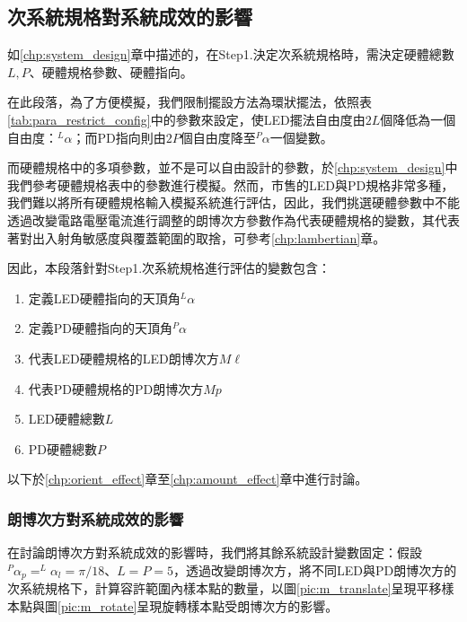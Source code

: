 \subsection{次系統規格對系統成效的影響}
\label{chp:design_result}

如\ref{chp:system_design}章中描述的，在Step1.決定次系統規格時，需決定硬體總數$L,P$、硬體規格參數、硬體指向。

在此段落，為了方便模擬，我們限制擺設方法為環狀擺法，依照表\ref{tab:para_restrict_config}中的參數來設定，使LED擺法自由度由$2L$個降低為一個自由度：$^L\alpha$；而PD指向則由$2P$個自由度降至$^P\alpha$一個變數。

而硬體規格中的多項參數，並不是可以自由設計的參數，於\ref{chp:system_design}中我們參考硬體規格表中的參數進行模擬。然而，市售的LED與PD規格非常多種，我們難以將所有硬體規格輸入模擬系統進行評估，因此，我們挑選硬體參數中不能透過改變電路電壓電流進行調整的朗博次方參數作為代表硬體規格的變數，其代表著對出入射角敏感度與覆蓋範圍的取捨，可參考\ref{chp:lambertian}章。

因此，本段落針對Step1.次系統規格進行評估的變數包含：
\begin{enumerate}
    \item 定義LED硬體指向的天頂角$^L\alpha$
    \item 定義PD硬體指向的天頂角$^P\alpha$
    \item 代表LED硬體規格的LED朗博次方$M\ell$
    \item 代表PD硬體規格的PD朗博次方$Mp$
    \item LED硬體總數$L$
    \item PD硬體總數$P$

\end{enumerate}

以下於\ref{chp:orient_effect}章至\ref{chp:amount_effect}章中進行討論。











\subsubsection{朗博次方對系統成效的影響}
\label{chp:m_effect}

在討論朗博次方對系統成效的影響時，我們將其餘系統設計變數固定：假設$^P\alpha_p =^L\alpha_l = \pi/18$、$L=P=5$，透過改變朗博次方，將不同LED與PD朗博次方的次系統規格下，計算容許範圍內樣本點的數量，以圖\ref{pic:m_translate}呈現平移樣本點與圖\ref{pic:m_rotate}呈現旋轉樣本點受朗博次方的影響。

